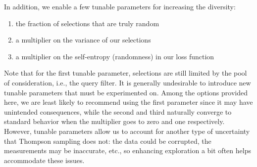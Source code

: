 \documentclass{article}
\begin{document}
In addition, we enable a few tunable parameters for increasing the diversity: 
\begin{enumerate}
\item the fraction of selections that are truly random
\item a multiplier on the variance of our selections
\item a multiplier on the self-entropy (randomness) in our loss function
\end{enumerate}
Note that for the first tunable parameter, selections are still limited by the pool of consideration, i.e., the query filter. It is generally undesirable to introduce new tunable parameters that must be experimented on. Among the options provided here, we are least likely to recommend using the first parameter since it may have unintended consequences, while the second and third naturally converge to standard behavior when the multiplier goes to zero and one respectively. However, tunable parameters allow us to account for another type of uncertainty that Thompson sampling does not: the data could be corrupted, the measurements may be inaccurate, etc., so enhancing exploration a bit often helps accommodate these issues.




\printbibliography
\end{document}
